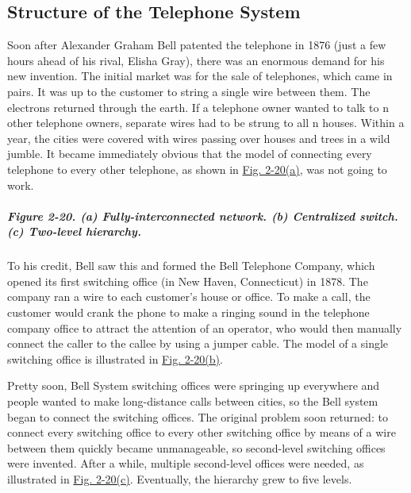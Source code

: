 \subsection{Structure of the Telephone System}

Soon after Alexander Graham Bell patented the telephone in 1876 (just a
few hours ahead of his rival, Elisha Gray), there was an enormous demand
for his new invention. The initial market was for the sale of
telephones, which came in pairs. It was up to the customer to string a
single wire between them. The electrons returned through the earth. If a
telephone owner wanted to talk to {n} other telephone owners, separate
wires had to be strung to all {n} houses. Within a year, the cities were
covered with wires passing over houses and trees in a wild jumble. It
became immediately obvious that the model of connecting every telephone
to every other telephone, as shown in
\protect\hyperlink{0130661023_ch02lev1sec5.htmlux5cux23ch02fig20}{Fig.
2-20(a)}, was not going to work.

\subparagraph[Figure 2-20. (a) Fully-interconnected network. (b)
Centralized switch. (c) Two-level
hierarchy.]{\texorpdfstring{\protect\hypertarget{0130661023_ch02lev1sec5.htmlux5cux23ch02fig20}{}{}Figure
2-20. (a) Fully-interconnected network. (b) Centralized switch. (c)
Two-level
hierarchy.}{Figure 2-20. (a) Fully-interconnected network. (b) Centralized switch. (c) Two-level hierarchy.}}


To his credit, Bell saw this and formed the Bell Telephone Company,
which opened its first switching office (in New Haven, Connecticut) in
1878. The company ran a wire to each customer's house or office. To make
a call, the customer would crank the phone to make a ringing sound in
the telephone company office to attract the attention of an operator,
who would then manually connect the caller to the callee by using a
jumper cable. The model of a single switching office is illustrated in
\protect\hyperlink{0130661023_ch02lev1sec5.htmlux5cux23ch02fig20}{Fig.
2-20(b)}.

Pretty soon, Bell System switching offices were springing up everywhere
and people wanted to make long-distance calls between cities, so the
Bell system began to connect the switching offices. The original problem
soon returned: to connect every switching office to every other
switching office by means of a wire between them quickly became
unmanageable, so second-level switching offices were invented. After a
while, multiple second-level offices were needed, as illustrated in
\protect\hyperlink{0130661023_ch02lev1sec5.htmlux5cux23ch02fig20}{Fig.
2-20(c)}. Eventually, the hierarchy grew to five levels.

